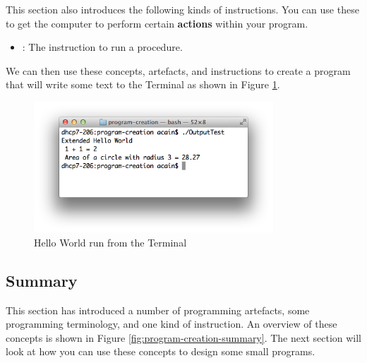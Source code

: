 This section also introduces the following kinds of instructions. You can use these to get the computer to perform certain \textbf{actions} within your program.
\begin{itemize}
  \item {}: The instruction to run a procedure.
\end{itemize}

We can then use these concepts, artefacts, and instructions to create a program that will write some text to the Terminal as shown in Figure \ref{fig:program-creation-helloworld}.

\begin{figure}[h]
   \centering
   \includegraphics[width=0.8\textwidth]{./topics/program-creation/images/HelloWorld} 
   \caption[Hello World Terminal]{Hello World run from the Terminal}
   \label{fig:program-creation-helloworld}
\end{figure}






% 






\clearpage
\subsection{Summary} %
\label{sub:program_creation_concepts_summary}

This section has introduced a number of programming artefacts, some programming terminology, and one kind of instruction. An overview of these concepts is shown in Figure \ref{fig:program-creation-summary}. The next section will look at how you can use these concepts to design some small programs.

